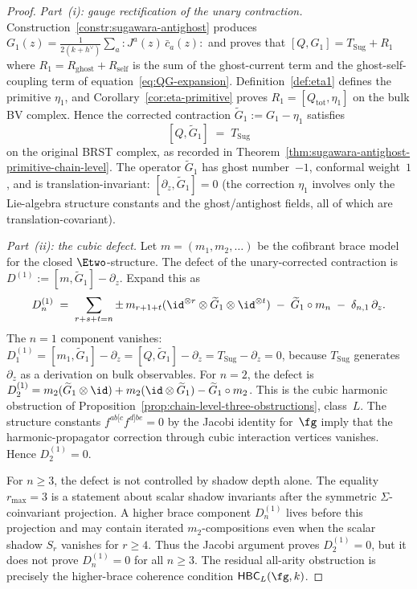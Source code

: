 \begin{proof}
\emph{Part~\textup{(i)}: gauge rectification of the
unary contraction.}
Construction~\ref{constr:sugawara-antighost} produces
$G_1(z) = \frac{1}{2(k+h^\vee)}\sum_a {:}J^a(z)\,
\bar c_a(z){:}$ and proves that
$[Q, G_1] = T_{\mathrm{Sug}} + R_1$ where
$R_1 = R_{\mathrm{ghost}} + R_{\mathrm{self}}$ is the sum
of the ghost-current term and the ghost-self-coupling term
of equation~\eqref{eq:QG-expansion}. Definition~\ref{def:eta1}
defines the primitive $\eta_1$, and
Corollary~\ref{cor:eta-primitive} proves
$R_1 = [Q_{\mathrm{tot}}, \eta_1]$ on the bulk BV complex. Hence
the corrected contraction $\widetilde G_1 := G_1 - \eta_1$ satisfies
\begin{equation}\label{eq:corrected-contraction}
[Q, \widetilde G_1] \;=\; T_{\mathrm{Sug}}
\end{equation}
on the original BRST complex, as recorded in
Theorem~\ref{thm:sugawara-antighost-primitive-chain-level}. The operator
$\widetilde G_1$ has ghost number~$-1$, conformal weight~$1$,
and is translation-invariant: $[\partial_z, \widetilde G_1] = 0$
\textup{(}the correction $\eta_1$ involves only the
Lie-algebra structure constants and the ghost/antighost
fields, all of which are translation-covariant\textup{)}.

\emph{Part~\textup{(ii)}: the cubic defect.}
Let $m = (m_1, m_2, \ldots)$ be the cofibrant brace model
for the closed $\Etwo$-structure. The defect of the
unary-corrected contraction is
$D^{(1)} := [m, \widetilde G_1] - \partial_z$.
Expand this as
\[
D^{(1)}_n
\;=\;
\sum_{r+s+t = n} \pm\,
m_{r+1+t}(\id^{\otimes r} \otimes \widetilde G_1
\otimes \id^{\otimes t})
\;-\;
\widetilde G_1 \circ m_n
\;-\; \delta_{n,1}\,\partial_z.
\]
The $n = 1$ component vanishes:
$D^{(1)}_1 = [m_1, \widetilde G_1] - \partial_z
= [Q, \widetilde G_1] - \partial_z
= T_{\mathrm{Sug}} - \partial_z = 0$,
because $T_{\mathrm{Sug}}$ generates $\partial_z$ as a
derivation on bulk observables.
For $n = 2$, the defect is
$D^{(1)}_2 = m_2(\widetilde G_1 \otimes \id)
+ m_2(\id \otimes \widetilde G_1)
- \widetilde G_1 \circ m_2$.
This is the cubic harmonic obstruction of
Proposition~\ref{prop:chain-level-three-obstructions},
class~$L$. The structure constants
$f^{ab[c} f^{d]be} = 0$ by the Jacobi identity for~$\fg$
imply that the harmonic-propagator correction through cubic
interaction vertices vanishes. Hence $D^{(1)}_2 = 0$.

For $n \geq 3$, the defect is not controlled by shadow
depth alone. The equality $r_{\max}=3$ is a statement
about scalar shadow invariants after the symmetric
$\Sigma$-coinvariant projection. A higher brace component
$D^{(1)}_n$ lives before this projection and may contain
iterated $m_2$-compositions even when the scalar shadow
$S_r$ vanishes for $r\geq4$. Thus the Jacobi argument
proves $D^{(1)}_2=0$, but it does not prove
$D^{(1)}_n=0$ for all $n\geq3$. The residual all-arity
obstruction is precisely the higher-brace coherence
condition $\mathsf{HBC}_L(\fg,k)$.


\end{proof}
